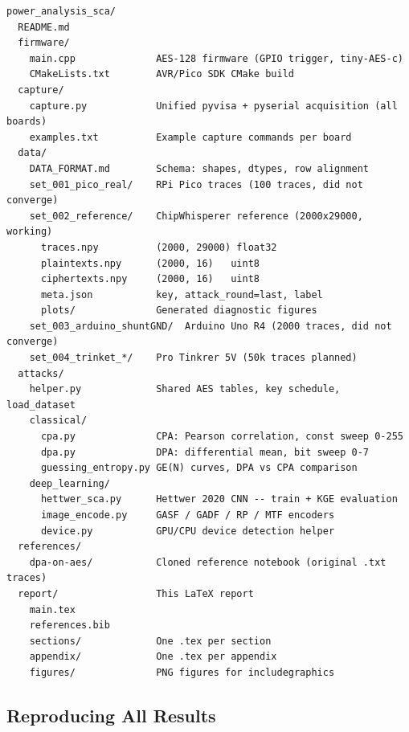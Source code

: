 \begin{verbatim}
power_analysis_sca/
  README.md
  firmware/
    main.cpp              AES-128 firmware (GPIO trigger, tiny-AES-c)
    CMakeLists.txt        AVR/Pico SDK CMake build
  capture/
    capture.py            Unified pyvisa + pyserial acquisition (all boards)
    examples.txt          Example capture commands per board
  data/
    DATA_FORMAT.md        Schema: shapes, dtypes, row alignment
    set_001_pico_real/    RPi Pico traces (100 traces, did not converge)
    set_002_reference/    ChipWhisperer reference (2000x29000, working)
      traces.npy          (2000, 29000) float32
      plaintexts.npy      (2000, 16)   uint8
      ciphertexts.npy     (2000, 16)   uint8
      meta.json           key, attack_round=last, label
      plots/              Generated diagnostic figures
    set_003_arduino_shuntGND/  Arduino Uno R4 (2000 traces, did not converge)
    set_004_trinket_*/    Pro Tinkrer 5V (50k traces planned)
  attacks/
    helper.py             Shared AES tables, key schedule, load_dataset
    classical/
      cpa.py              CPA: Pearson correlation, const sweep 0-255
      dpa.py              DPA: differential mean, bit sweep 0-7
      guessing_entropy.py GE(N) curves, DPA vs CPA comparison
    deep_learning/
      hettwer_sca.py      Hettwer 2020 CNN -- train + KGE evaluation
      image_encode.py     GASF / GADF / RP / MTF encoders
      device.py           GPU/CPU device detection helper
  references/
    dpa-on-aes/           Cloned reference notebook (original .txt traces)
  report/                 This LaTeX report
    main.tex
    references.bib
    sections/             One .tex per section
    appendix/             One .tex per appendix
    figures/              PNG figures for includegraphics
\end{verbatim}

\subsection{Reproducing All Results}

